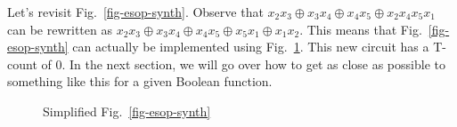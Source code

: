 \begin{example}
  \label{ex-esop-synth2}
  Let's revisit Fig.~\ref{fig-esop-synth}. Observe that
  $x_2x_3 \oplus x_3x_4 \oplus x_4x_5 \oplus x_2x_4 x_5x_1$ can be rewritten as
  $x_2x_3 \oplus x_3x_4 \oplus x_4x_5 \oplus x_5x_1 \oplus x_1x_2$. This means that
  Fig.~\ref{fig-esop-synth} can actually be implemented using Fig.~\ref{fig-esop-synth2}.
  This new circuit has a T-count of 0. In the next section, we will go over how to
  get as close as possible to something like this for a given Boolean function.

  \begin{figure}[t]
    \centering
    \scalebox{1.0}{
      
    }
    \caption{Simplified Fig.~\ref{fig-esop-synth}}
    \label{fig-esop-synth2}
    \vspace{-0.5cm}    
  \end{figure}
\end{example}

